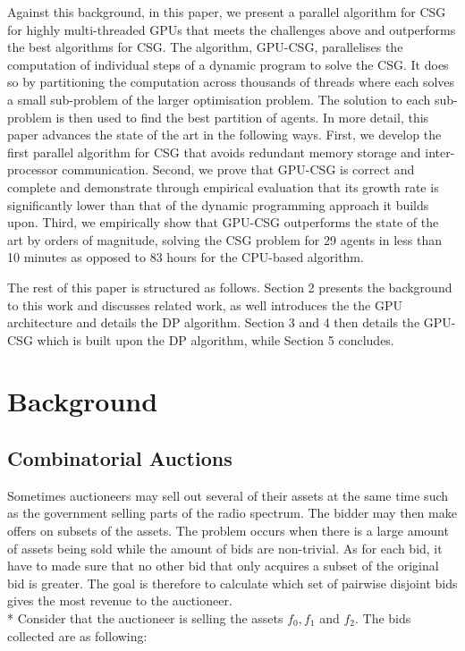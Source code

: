 \documentclass[a4paper, 12pt]{report}
\begin{document}
Against this background, in this paper, we present a parallel algorithm for CSG
for highly multi-threaded GPUs that meets the challenges above and outperforms
the best algorithms for CSG. The algorithm, GPU-CSG, parallelises the
computation of individual steps of a dynamic program to solve the CSG. It does
so by partitioning the computation across thousands of threads where each solves
a small sub-problem of the larger optimisation problem. The solution to each
sub-problem is then used to find the best partition of agents. In more detail,
this paper advances the state of the art in the following ways. First, we
develop the first parallel  algorithm for CSG that avoids redundant memory
storage and inter-processor communication. Second, we prove that GPU-CSG is
correct and complete and demonstrate through empirical evaluation that its
growth rate is significantly lower than that of the dynamic programming approach
it builds upon. Third, we empirically show that GPU-CSG outperforms the state of
the art by 
orders of magnitude, solving the CSG problem for 29 agents in less than 10
minutes
as opposed to 83 hours for the CPU-based algorithm.

The rest of this paper is structured as follows. Section 2 presents the
background to this work and discusses related work, as well introduces the
the GPU architecture and details the DP algorithm. Section 3 and 4 then details
the GPU-CSG which is built upon the DP algorithm,
while Section 5 concludes.


\section{Background}
\subsection{Combinatorial Auctions}
Sometimes auctioneers may sell out several of their assets at the same time such
as the government selling parts of the radio spectrum. The bidder may then make
offers on subsets of the assets. The problem occurs when there is a large amount
of assets being sold while the amount of bids are non-trivial. As for each bid, 
it have to made sure that no other bid that only acquires a subset of the
original bid is greater.
The goal is therefore to calculate which set of pairwise disjoint bids gives the
most revenue to the auctioneer.\\*
 Consider that the auctioneer is selling the assets $f_0 , f_1$
and $f_2$. The bids collected are as following:
\end{document}
